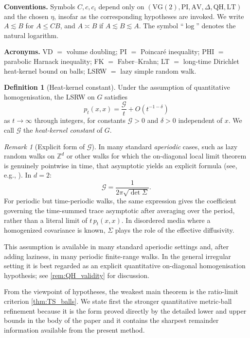 \documentclass[reqno]{amsart}
\numberwithin{equation}{section}
\theoremstyle{definition}
\newtheorem{definition}[definition]{Definition}
\theoremstyle{remark}
\newtheorem{remark}[remark]{Remark}
\newcommand{\Cref}[1]{\autoref{#1}}
\newcommand{\cG}{\mathcal{G}}
\begin{document}
\noindent\textbf{Conventions.} Symbols $C,c,c_i$ depend only on $(\mathrm{VG(2)},\mathrm{PI},\mathrm{AV},\Delta,\mathrm{QH},\mathrm{LT})$ and the chosen $\eta$, insofar as the corresponding hypotheses are invoked. We write $A\lesssim B$ for $A\le C B$, and $A\asymp B$ if $A\lesssim B\lesssim A$. The symbol ``$\log$'' denotes the natural logarithm.

\noindent\textbf{Acronyms.} VD $=$ volume doubling; PI $=$ Poincar\'e inequality; PHI $=$ parabolic Harnack inequality; FK $=$ Faber--Krahn; LT $=$ long-time Dirichlet heat-kernel bound on balls; LSRW $=$ lazy simple random walk.

\begin{definition}[Heat-kernel constant]\label{def:G}
Under the assumption of quantitative homogenisation, the LSRW on $G$ satisfies
\[
  p_t(x,x)=\frac{\cG}{t}+O(t^{-1-\delta})
\]
as $t\to\infty$ through integers, for constants $\cG>0$ and $\delta>0$ independent of $x$. We call $\cG$ the \emph{heat-kernel constant} of $G$.
\end{definition}


\begin{remark}[Explicit form of $\cG$]\label{rem:G_formula}
In many standard \emph{aperiodic} cases, such as lazy random walks on $\mathbb{Z}^d$ or other walks for which the on-diagonal local limit theorem is genuinely pointwise in time, that asymptotic yields an explicit formula (see, e.g., \cite[Ch. 2]{LawlerLimic10}). In $d=2$:
\[
\cG = \frac{1}{2\pi\sqrt{\det\Sigma}}.
\]
For periodic but time-periodic walks, the same expression gives the coefficient governing the time-summed trace asymptotic after averaging over the period, rather than a literal limit of $t\,p_t(x,x)$. In disordered media where a homogenized covariance is known, $\Sigma$ plays the role of the effective diffusivity.
\end{remark}

This assumption is available in many standard aperiodic settings and, after adding laziness, in many periodic finite-range walks. In the general irregular setting it is best regarded as an explicit quantitative on-diagonal homogenisation hypothesis; see \Cref{rem:QH_validity} for discussion.

From the viewpoint of hypotheses, the weakest main theorem is the ratio-limit criterion \Cref{thm:TS_balls}. We state first the stronger quantitative metric-ball refinement because it is the form proved directly by the detailed lower and upper bounds in the body of the paper and it contains the sharpest remainder information available from the present method.
\end{document}
